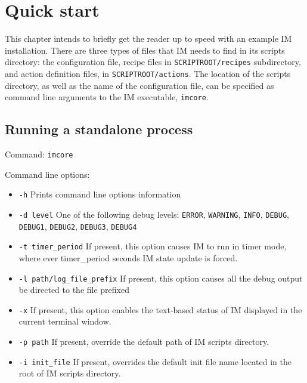 \chapter{Quick start} %
\label{Chapter2}

This chapter intends to briefly get the reader up to speed with an example IM installation. There are three types of files that IM needs to find in its scripts directory: the configuration file, recipe files in \texttt{SCRIPTROOT/recipes} subdirectory, and action definition files, in \texttt{SCRIPTROOT/actions}. The location of the scripts directory, as well as the name of the configuration file, can be specified as command line arguments to the IM executable, \texttt{imcore}.


\section{Running a standalone process}

Command: \texttt{imcore}

\vskip 2mm

\noindent Command line options:

\begin{itemize}
\item[] \texttt{-h} \hspace{2cm} Prints command line options information

\item[] \texttt{-d level} \hspace{2cm} One of the following debug levels: \texttt{ERROR}, \texttt{WARNING}, \texttt{INFO}, \texttt{DEBUG}, \texttt{DEBUG1}, \texttt{DEBUG2}, \texttt{DEBUG3}, \texttt{DEBUG4}

\item[] \texttt{-t timer\_period} \hspace{2cm} If present, this option causes IM to run in timer mode, where ever timer\_period seconds IM state update is forced.

\item[] \texttt{-l path/log\_file\_prefix} \hspace{2cm} If present, this option causes all the debug output be directed to the file prefixed

\item[] \texttt{-x} \hspace{2cm} If present, this option enables the text-based status of IM displayed in the current terminal window.

\item[] \texttt{-p path} \hspace{2cm} If present, override the default path of IM scripts directory.

\item[] \texttt{-i init\_file} \hspace{2cm} If present, overrides the default init file name located in the root of IM scripts directory.

\end{itemize}

